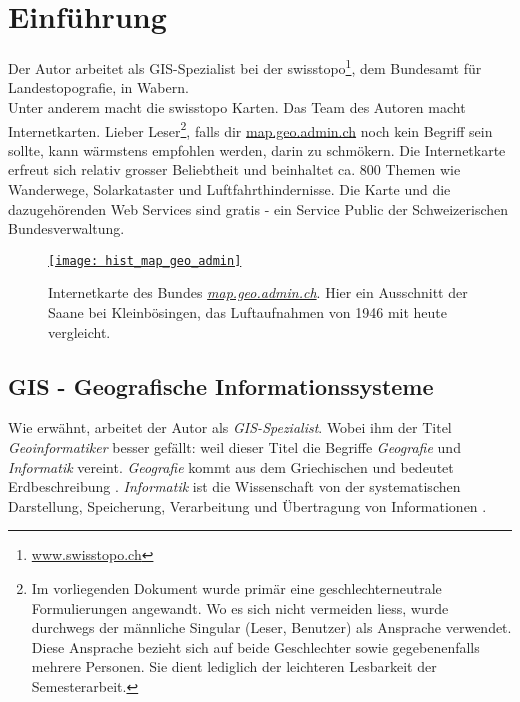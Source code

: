 \section{Einführung}
Der Autor arbeitet als GIS-Spezialist bei der swisstopo\footnote{\href{https://www.swisstopo.ch}{www.swisstopo.ch}}, dem Bundesamt für Landestopografie, in Wabern.\\ Unter anderem macht die swisstopo Karten. Das Team des Autoren macht Internetkarten. Lieber Leser\footnote{Im vorliegenden Dokument wurde primär eine geschlechterneutrale Formulierungen angewandt. Wo es sich nicht vermeiden liess, wurde durchwegs der männliche Singular (Leser, Benutzer) als Ansprache verwendet. Diese Ansprache bezieht sich auf beide Geschlechter sowie gegebenenfalls mehrere Personen. Sie dient lediglich der leichteren Lesbarkeit der Semesterarbeit.}, falls dir \href{https://map.geo.admin.ch}{map.geo.admin.ch} noch kein Begriff sein sollte, kann wärmstens empfohlen werden, darin zu schmökern. Die Internetkarte erfreut sich relativ grosser Beliebtheit und beinhaltet ca. 800 Themen wie Wanderwege, Solarkataster und Luftfahrthindernisse. Die Karte und die dazugehörenden Web Services sind gratis - ein Service Public der Schweizerischen Bundesverwaltung.

\begin{figure}[H]
	\centering
	\href{https://s.geo.admin.ch/8a82499889}{
	\texttt{[image: hist\_map\_geo\_admin]}}
	\caption{Internetkarte des Bundes \emph{\href{https://s.geo.admin.ch/8a82499889}{map.geo.admin.ch}}. Hier ein Ausschnitt der Saane bei Kleinbösingen, das Luftaufnahmen von 1946 mit heute vergleicht.}
	\label{fig:map.geo.admin.ch}
\end{figure}


\subsection{GIS - Geografische Informationssysteme}
Wie erwähnt, arbeitet der Autor als \emph{GIS-Spezialist}. Wobei ihm der Titel \emph{Geoinformatiker} besser gefällt: weil dieser Titel die Begriffe \emph{Geografie} und \emph{Informatik} vereint. \emph{Geografie} kommt aus dem Griechischen und bedeutet Erdbeschreibung \autocite[14]{Schertenleib2004}. \emph{Informatik} ist die Wissenschaft von der systematischen Darstellung, Speicherung, Verarbeitung und Übertragung von Informationen \cite{Informatik2010}.

